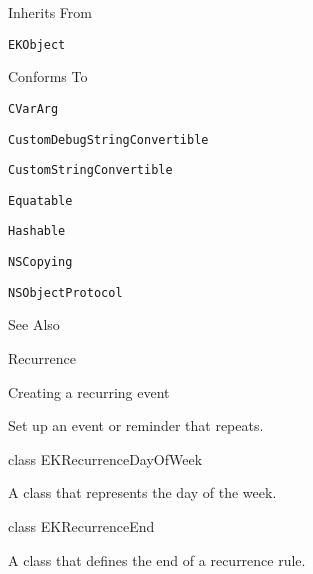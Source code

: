 \documentclass{article}
\begin{document}
Inherits From

\texttt{EKObject}

Conforms To

\texttt{CVarArg}

\texttt{CustomDebugStringConvertible}

\texttt{CustomStringConvertible}

\texttt{Equatable}

\texttt{Hashable}

\texttt{NSCopying}

\texttt{NSObjectProtocol}

See Also

Recurrence

Creating a recurring event

Set up an event or reminder that repeats.

class EKRecurrenceDayOfWeek

A class that represents the day of the week.

class EKRecurrenceEnd

A class that defines the end of a recurrence rule.

\newpage
\end{document}

